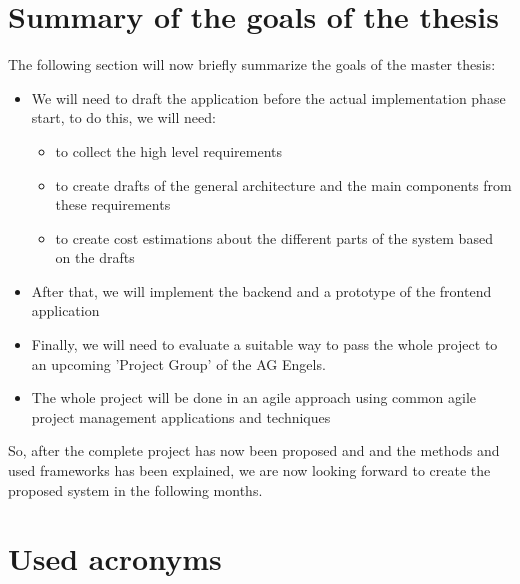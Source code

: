 \documentclass[a4page]{article}
\begin{document}
\section{Summary of the goals of the thesis}
The following section will now briefly summarize the goals of the master thesis:
\begin{itemize}
	\item We will need to draft the application before the actual implementation phase start, to do this, we will need:
	\begin{itemize}
	\item to collect the high level requirements %
	\item to create drafts of the general architecture and the main components from these requirements
	\item to create cost estimations about the different parts of the system based on the drafts
	\end{itemize} 
	\item After that, we will implement the backend and a prototype of the frontend application %
	\item Finally, we will need to evaluate a suitable way to pass the whole project to an upcoming 
	'Project Group' of the AG Engels.  
	\item The whole project will be done in an agile approach using common agile project management  applications and techniques
\end{itemize} 

So, after the complete project has now been proposed and and the methods and used frameworks has been explained, we are now looking forward to create the proposed system in the following months.

\clearpage

\section*{Used acronyms}
\begin{acronym}[somethinglonger]
\end{acronym}



\end{document}
